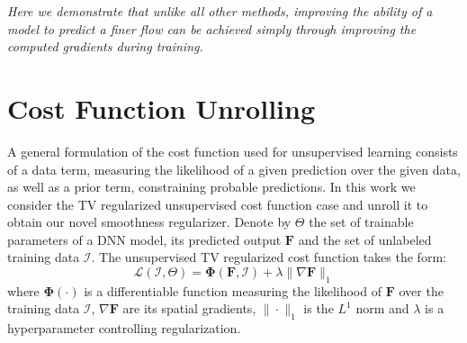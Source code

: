 \documentclass[10pt,twocolumn,letterpaper]{article}
\begin{document}
\emph{Here we demonstrate that unlike all other methods, improving the ability of a model to predict a finer flow can be achieved simply through improving the computed gradients during training.}













  \section{Cost Function Unrolling}
A general formulation of the cost function used for unsupervised learning consists of a data term, measuring the likelihood of a given prediction over the given data, as well as a prior term, constraining probable predictions. In this work we consider the TV regularized unsupervised cost function case and unroll it to obtain our novel smoothness regularizer. Denote by $\Theta$ the set of trainable parameters of a DNN model, its predicted output $\mathbf{F}$ and the set of unlabeled training data $\mathcal{I}$. The unsupervised TV regularized cost function takes the form:
\begin{equation} \label{eq:loss}
    \mathcal{L}(\mathcal{I},\Theta) = \mathbf{\Phi}\left( \mathbf{F},\mathcal{I} \right)+\lambda\|\nabla \mathbf{F} \|_1
\end{equation}
where $\mathbf{\Phi(\cdot)}$ is a differentiable function measuring the likelihood of $\mathbf{F}$ over the training data $\mathcal{I}$, $\nabla \mathbf{F}$ are its spatial gradients, $\|\cdot\|_1$ is the $L^1$ norm and $\lambda$ is a hyperparameter controlling regularization.
\end{document}
